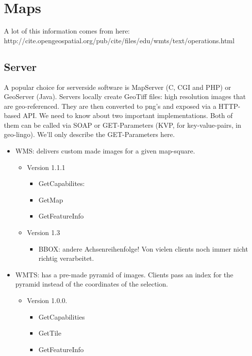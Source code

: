 \section{Maps}

A lot of this information comes from here: http://cite.opengeospatial.org/pub/cite/files/edu/wmts/text/operations.html


\subsection{Server}
A popular choice for serverside software is MapServer (C, CGI and PHP) or GeoServer (Java). Servers locally create GeoTiff files: high resolution images that are geo-referenced. They are then converted to png's and exposed via a HTTP-based API. We need to know about two important implementations. Both of them can be called via SOAP or GET-Parameters (KVP, for key-value-pairs, in geo-lingo). We'll only describe the GET-Parameters here. 

\begin{itemize}
    \item WMS: delivers custom made images for a given map-square. 
    \begin{itemize}
        \item Version 1.1.1
            \begin{itemize}
                \item GetCapabilites: 
                \item GetMap 
                \item GetFeatureInfo
            \end{itemize}
        \item Version 1.3
            \begin{itemize}
                \item BBOX: andere Achsenreihenfolge! Von vielen clients noch immer nicht richtig verarbeitet. 
            \end{itemize}
    \end{itemize}
    
    \item WMTS: has a pre-made pyramid of images. Clients pass an index for the pyramid instead of the coordinates of the selection. 
    \begin{itemize}
        \item Version 1.0.0.
            \begin{itemize}
                \item GetCapabilities 
                \item GetTile 
                \item GetFeatureInfo
            \end{itemize}
    \end{itemize}
\end{itemize}

